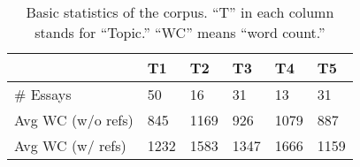 \begin{table}[]
    \centering
    \small
    \begin{tabular}{llllll}
    \toprule
    &  T1 & T2 & T3 & T4 & T5 \\ \midrule
    \# Essays     & 50 & 16 & 31 & 13 & 31 \\ 
    
    Avg WC (w/o refs) & 845 & 1169 & 926 & 1079 & 887 \\ 
    
    Avg WC (w/ refs)  & 1232 & 1583 & 1347 & 1666 & 1159 \\ \bottomrule
    \end{tabular}
    \caption{Basic statistics of the corpus. ``T'' in each column stands for ``Topic.'' ``WC'' means ``word count.''}
    \label{tab:basicStatistics}
\end{table}